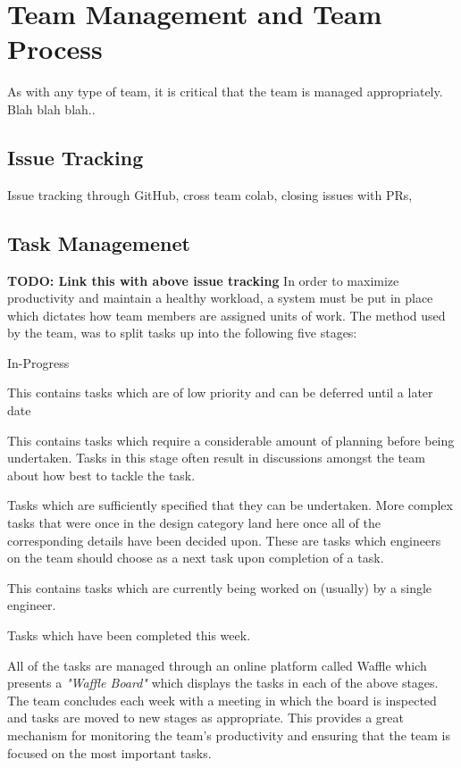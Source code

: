 \chapter{Team Management and Team Process}
As with any type of team, it is critical that the team is managed appropriately. Blah blah blah.. 

\section{Issue Tracking}
Issue tracking through GitHub, cross team colab, closing issues with PRs, 

\section{Task Managemenet}
\textbf{TODO: Link this with above issue tracking}
In order to maximize productivity and maintain a healthy workload, a system must be put in place which dictates how team members are assigned units of work. The method used by the \team{} team, was to split tasks up into the following five stages:

\begin{labeling}{In-Progress}
	\item [Backlog] This contains tasks which are of low priority and can be deferred until a later date
	\item [Design] This contains tasks which require a considerable amount of planning before being undertaken. Tasks in this stage often result in discussions amongst the team about how best to tackle the task.
	\item [Ready] Tasks which are sufficiently specified that they can be undertaken. More complex tasks that were once in the design category land here once all of the corresponding details have been decided upon. These are tasks which engineers on the team should choose as a next task upon completion of a task.
	\item [In-Progress] This contains tasks which are currently being worked on (usually) by a single engineer.
	\item [Completed] Tasks which have been completed this week.
\end{labeling}

All of the tasks are managed through an online platform called Waffle\cite{waffle} which presents a \textit{"Waffle Board"} which displays the tasks in each of the above stages. The team concludes each week with a meeting in which the board is inspected and tasks are moved to new stages as appropriate. This provides a great mechanism for monitoring the team's productivity and ensuring that the team is focused on the most important tasks. 

